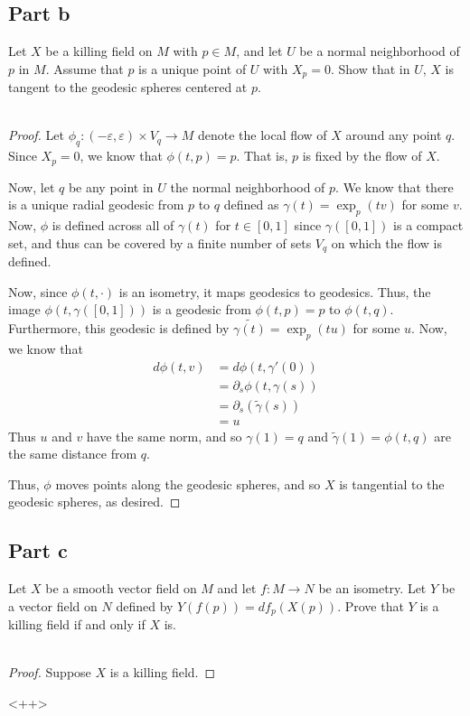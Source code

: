 \documentclass[fontsize=11pt]{scrartcl} %
\numberwithin{equation}{section} %
\numberwithin{figure}{section} %
\numberwithin{table}{section} %
\begin{document}
\subsection*{Part b}
Let $X$ be a killing field on $M$ with $p\in M$, and let $U$ be a normal
neighborhood of $p$ in $M$. Assume that $p$ is a unique point of $U$ with
$X_p=0$. Show that in $U$, $X$ is tangent to the geodesic spheres centered at
$p$.
\\
\\
\begin{proof}
    Let $\phi_q:(-\varepsilon,\varepsilon)\times V_q\to M$ denote the local flow
    of $X$ around any point $q$. Since $X_p = 0$, we know that $\phi(t,p) = p$.
    That is, $p$ is fixed by the flow of $X$. 

    Now, let $q$ be any point in $U$ the normal neighborhood of $p$. We know
    that there is a unique radial geodesic from $p$ to $q$ defined as $\gamma(t)
    = \exp_p(tv)$ for some $v$. Now, $\phi$ is defined
    across all of $\gamma(t)$ for $t\in[0,1]$ since $\gamma([0,1])$ is a compact
    set, and thus can be covered by a finite number of sets $V_q$ on which the
    flow is defined.

    Now, since $\phi(t,\cdot)$ is an isometry, it maps geodesics to geodesics.
    Thus, the image $\phi(t,\gamma([0,1]))$ is a geodesic from $\phi(t,p)=p$ to
    $\phi(t,q)$. Furthermore, this geodesic is defined by $\tilde{\gamma(t)} =
    \exp_p(tu)$ for some $u$. Now, we know that
    \[
\begin{aligned}
    d\phi(t,v) &= d\phi(t,\gamma'(0))\\
    &= \partial_s\phi(t,\gamma(s))\\
    &= \partial_s(\tilde{\gamma}(s))\\
    &= u
\end{aligned}
    \]
    Thus $u$ and $v$ have the same norm, and so $\gamma(1)=q$ and
    $\tilde{\gamma}(1)=\phi(t,q)$ are the same distance from $q$.

    Thus, $\phi$ moves points along the geodesic spheres, and so $X$ is
    tangential to the geodesic spheres, as desired.
\end{proof}

\subsection*{Part c}
Let $X$ be a smooth vector field on $M$ and let $f:M\to N$ be an isometry. Let
$Y$ be a vector field on $N$ defined by $Y(f(p))=df_p(X(p))$. Prove that $Y$ is
a killing field if and only if $X$ is.
\\
\\
\begin{proof}
    Suppose $X$ is a killing field. 
\end{proof}<++>
\end{document}
